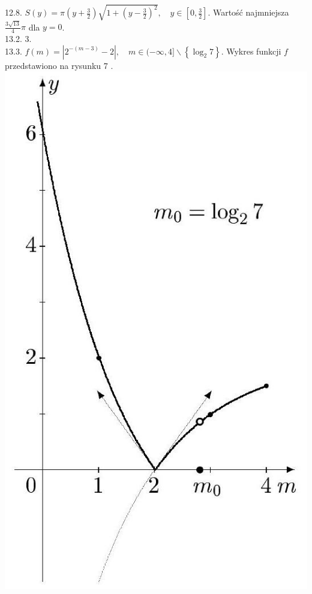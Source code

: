 \documentclass[10pt]{article}
\begin{document}
12.8. $S(y)=\pi\left(y+\frac{3}{2}\right) \sqrt{1+\left(y-\frac{3}{2}\right)^{2}}, \quad y \in\left[0, \frac{3}{2}\right]$. Wartość najmniejsza $\frac{3 \sqrt{13}}{4} \pi$ dla $y=0$.\\
13.2. 3.\\
13.3. $f(m)=\left|2^{-(m-3)}-2\right|, \quad m \in(-\infty, 4] \backslash\left\{\log _{2} 7\right\}$. Wykres funkcji $f$ przedstawiono na rysunku 7 .\\
\includegraphics[max width=\textwidth, center]{2024_11_16_fe5b564401bf7db98894g-061}
\end{document}
